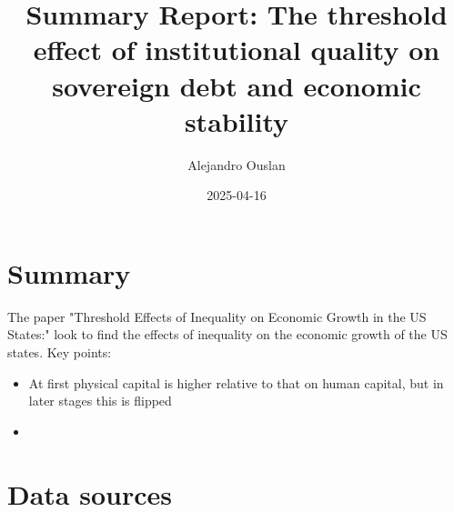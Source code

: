 \documentclass[10pt, oneside]{article}
\title{Summary Report: The threshold effect of institutional quality on sovereign debt and economic stability}
\author{Alejandro Ouslan}
\date{2025-04-16}
\begin{document}
\maketitle
\tableofcontents

\vspace{.25in}

\section{Summary}
The paper "Threshold Effects of Inequality on Economic Growth in the US States:"\cite{ccepni2020threshold} look to find the effects of inequality
on the economic growth of the US states. Key points:
\begin{itemize}
	\item At first physical capital is higher relative to that on human capital, but in later stages this is flipped
	\item
\end{itemize}

\section{Data sources}
\end{document}
